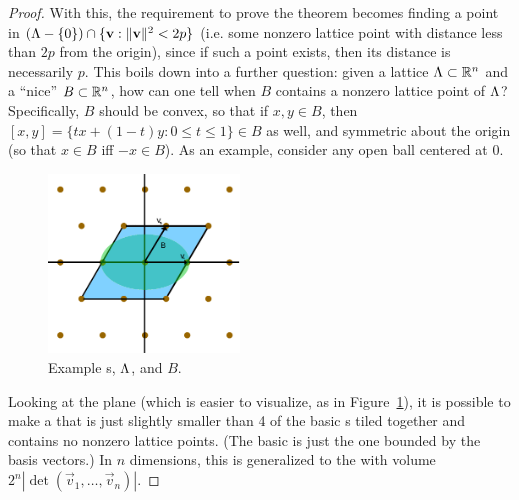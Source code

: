 \begin{proof}
With this, the requirement to prove the theorem becomes finding a point in $(\Lambda-\{0\})\cap\{\mathbf v:\|\mathbf v\|^2 < 2p\}$ (i.e. some nonzero lattice point with distance less than $2p$ from the origin), since if such a point exists, then its distance is necessarily $p$. This boils down into a further question: given a lattice $\Lambda\subset\mathbb{R}^n$ and a ``nice'' $B\subset\mathbb{R}^n$, how can one tell when $B$ contains a nonzero lattice point of $\Lambda$? Specifically, $B$ should be convex, so that if $x,y\in B$, then $[x,y] = \{tx+(1-t)y:0\le t\le 1\}\in B$ as well, and symmetric about the origin (so that $x\in B$ iff $-x\in B$). As an example, consider any open ball centered at 0.
\begin{figure}[h]
\centering
\includegraphics[width=2in]{Triangular_point_lattice}
\caption{Example \pgram{}s, $\Lambda$, and $B$.}
\label{circlelattice}
\end{figure}

Looking at the plane (which is easier to visualize, as in Figure~\ref{circlelattice}), it is possible to make a \pgram{} that is just slightly smaller than 4 of the basic \pgram{}s tiled together and contains no nonzero lattice points. (The basic \pgram{} is just the one bounded by the basis vectors.) In $n$ dimensions, this is generalized to the \ptope{} with volume $2^n|\det(\vec v_1,\dots,\vec v_n)|$.


\end{proof}

